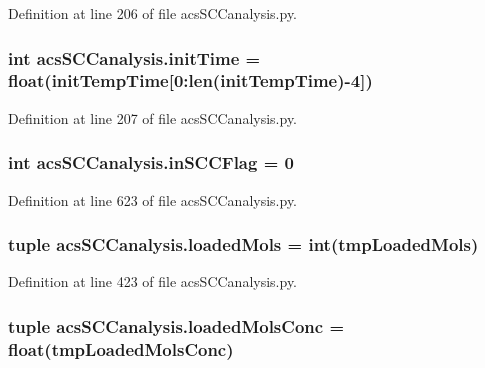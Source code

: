 Definition at line 206 of file acs\-S\-C\-Canalysis.\-py.

\hypertarget{a00128_a826c1b0585b4e8474c76f92bd7583836}{
\subsubsection[{init\-Time}]{\setlength{\rightskip}{0pt plus 5cm}int acs\-S\-C\-Canalysis.\-init\-Time = float({\bf init\-Temp\-Time}\mbox{[}0\-:len({\bf init\-Temp\-Time})-\/4\mbox{]})}}\label{a00128_a826c1b0585b4e8474c76f92bd7583836}


Definition at line 207 of file acs\-S\-C\-Canalysis.\-py.

\hypertarget{a00128_a6405b6b05e7b87812422cc30d2034904}{
\subsubsection[{in\-S\-C\-C\-Flag}]{\setlength{\rightskip}{0pt plus 5cm}int acs\-S\-C\-Canalysis.\-in\-S\-C\-C\-Flag = 0}}\label{a00128_a6405b6b05e7b87812422cc30d2034904}


Definition at line 623 of file acs\-S\-C\-Canalysis.\-py.

\hypertarget{a00128_ab4566d46d368eb4f93ff6db5191648bd}{
\subsubsection[{loaded\-Mols}]{\setlength{\rightskip}{0pt plus 5cm}tuple acs\-S\-C\-Canalysis.\-loaded\-Mols = int(tmp\-Loaded\-Mols)}}\label{a00128_ab4566d46d368eb4f93ff6db5191648bd}


Definition at line 423 of file acs\-S\-C\-Canalysis.\-py.

\hypertarget{a00128_abe83f5e0ae3bd65da15a697a979aeea1}{
\subsubsection[{loaded\-Mols\-Conc}]{\setlength{\rightskip}{0pt plus 5cm}tuple acs\-S\-C\-Canalysis.\-loaded\-Mols\-Conc = float(tmp\-Loaded\-Mols\-Conc)}}\label{a00128_abe83f5e0ae3bd65da15a697a979aeea1}



